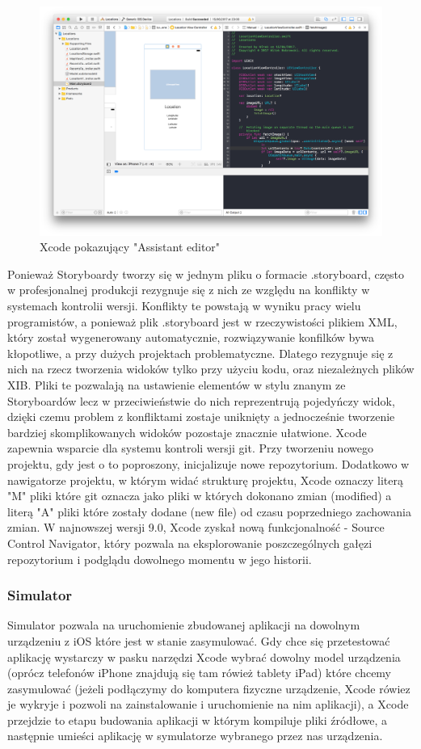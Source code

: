 \begin{figure}[ht!]
  \centering
  \includegraphics[width=120mm]{images/chapter-2-image-2-xcode.png}
  \caption{Xcode pokazujący "Assistant editor"}
  \label{chapter-2-image-2-xcode}
\end{figure}

Ponieważ Storyboardy tworzy się w jednym pliku o formacie .storyboard, często w profesjonalnej produkcji rezygnuje się z nich ze
względu na konflikty w systemach kontrolii wersji. Konflikty te powstają w wyniku pracy wielu programistów, a ponieważ plik .storyboard
jest w rzeczywistości plikiem XML, który został wygenerowany automatycznie, rozwiązywanie konfilków bywa kłopotliwe, a przy dużych
projektach problematyczne. Dlatego rezygnuje się z nich na rzecz tworzenia widoków tylko przy użyciu kodu, oraz niezależnych plików XIB.
Pliki te pozwalają na ustawienie elementów w stylu znanym ze Storyboardów lecz w przeciwieństwie do nich reprezentrują pojedyńczy widok,
dzięki czemu problem z konfliktami zostaje uniknięty a jednocześnie tworzenie bardziej skomplikowanych widoków pozostaje znacznie
ułatwione.
Xcode zapewnia wsparcie dla systemu kontroli wersji git. Przy tworzeniu nowego projektu, gdy jest o to poproszony, inicjalizuje nowe
repozytorium. Dodatkowo w nawigatorze projektu, w którym widać strukturę projektu, Xcode oznaczy literą "M" pliki które git oznacza
jako pliki w których dokonano zmian (modified) a literą "A" pliki które zostały dodane (new file) od czasu poprzedniego zachowania zmian.
W najnowszej wersji 9.0, Xcode zyskał nową funkcjonalność - Source Control Navigator, który pozwala na eksplorowanie poszczególnych
gałęzi repozytorium i podglądu dowolnego momentu w jego historii.

\subsubsection*{Simulator}
Simulator pozwala na uruchomienie zbudowanej aplikacji na dowolnym urządzeniu z iOS które jest w stanie zasymulować. Gdy chce się
przetestować aplikację wystarczy w pasku narzędzi Xcode wybrać dowolny model urządzenia (oprócz telefonów iPhone znajdują się tam
rówież tablety iPad) które chcemy zasymulować (jeżeli podłączymy do komputera fizyczne urządzenie, Xcode rówiez je wykryje i pozwoli
na zainstalowanie i uruchomienie na nim aplikacji), a Xcode przejdzie to etapu budowania aplikacji w którym kompiluje pliki źródłowe,
a następnie umieści aplikację w symulatorze wybranego przez nas urządzenia.

